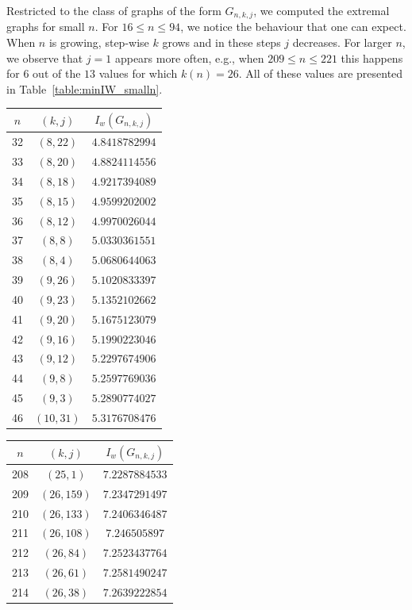 \documentclass{article}
\begin{document}
{Restricted to the class of graphs of the form $G_{n,k,j}$, we computed the extremal graphs for small $n.$
For $16\le n \le 94$, we notice the behaviour that one can expect.
When $n$ is growing, step-wise $k$ grows and in these steps $j$ decreases. 
For larger $n$, we observe that $j=1$ appears more often, e.g., when $209 \le n \le 221$ this happens for $6$ out of the $13$ values for which $k(n)=26.$
All of these values are presented in Table~\ref{table:minIW_smalln}.


\begin{table}[h]
\centering
\begin{tabular}{|c|c|c|}
	\hline
	\textbf{$n$} & \textbf{$(k,j)$} & \textbf{$I_w(G_{n,k,j})$} \\
	\hline
 32& $(8, 22)$ & $ 4.8418782994
$\\ 33& $(8, 20)$ & $ 4.8824114556
$\\34& $(8, 18)$ & $ 4.9217394089
$\\35& $(8, 15)$ & $ 4.9599202002
$\\36& $(8, 12)$ & $ 4.9970026044
$\\37& $(8, 8)$ & $ 5.0330361551
$\\38& $(8, 4)$ & $ 5.0680644063
$\\39& $(9, 26)$ & $ 5.1020833397
$\\40& $(9, 23)$ & $ 5.1352102662
$\\41& $(9, 20)$ & $ 5.1675123079
$\\42& $(9, 16)$ & $ 5.1990223046
$\\43& $(9, 12)$ & $ 5.2297674906
$\\44& $(9, 8)$ & $ 5.2597769036
$\\45& $(9, 3)$ & $ 5.2890774027
$\\
46& $( 10, 31)$ & $ 5.3176708476$\\
	\hline
	\end{tabular}
	\quad
	\begin{tabular}{|c|c|c|}
	\hline
	\textbf{$n$} & \textbf{$(k,j)$} & \textbf{$I_w(G_{n,k,j})$} \\
	\hline
208&$(25,1)$& $7.2287884533$\\
209&$(26,159)$& $7.2347291497$\\
210&$(26,133)$& $7.2406346487$\\
211&$(26,108)$& $7.246505897$\\
212&$(26,84)$& $7.2523437764$\\
213&$(26,61)$& $7.2581490247$\\
214&$(26,38)$& $7.2639222854$\\

\end{tabular}
\end{table}}
\end{document}
